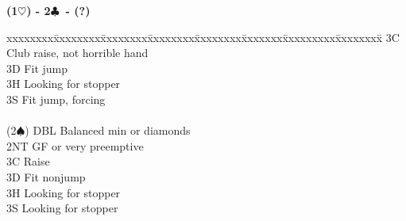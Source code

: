 \documentclass[10pt]{article}
\renewcommand{\c}{$\clubsuit$}
\newcommand{\h}{$\heartsuit$}
\newcommand{\s}{$\spadesuit$}
\newenvironment{bidtable}[1][]
{\textbf{#1}
  \begin{adjustwidth}{1em}{}
    \addvspace{2pt}
    \begin{tabbing}
      xxxxxxxx\=xxxxxxxx\=xxxxxxxx\=xxxxxxxx\=xxxxxxxx\=xxxxxxx\=xxxxxxxxx\=xxxxxxxx\=\kill}
{\end{tabbing}\end{adjustwidth}\bigskip}%
\begin{document}
\begin{bidtable}[(1\h) - 2\c\ - (?)]
      \> 3C   \> Club raise, not horrible hand                                 \\
      \> 3D   \> Fit jump                                                      \\
      \> 3H   \> Looking for stopper                                           \\
      \> 3S   \> Fit jump, forcing                                             \\
                                                                               \\
(2\s) \> DBL  \> Balanced min or diamonds                                      \\
      \> 2NT  \> GF or very preemptive                                         \\
      \> 3C   \> Raise                                                         \\
      \> 3D   \> Fit nonjump                                                   \\
      \> 3H   \> Looking for stopper                                           \\
      \> 3S   \> Looking for stopper
\end{bidtable}
\end{document}
